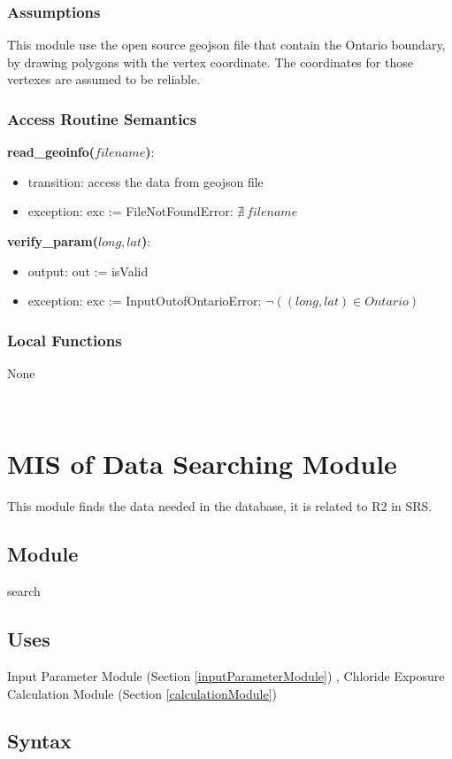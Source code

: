 \documentclass[12pt, titlepage]{article}
\begin{document}
\subsubsection{Assumptions}
This module use the open source geojson file that contain the Ontario boundary, by drawing polygons with the vertex coordinate. The coordinates for those vertexes are assumed to be reliable.

\subsubsection{Access Routine Semantics}
\noindent \textbf{read\_geoinfo($filename$)}:
\begin{itemize}
\item transition: access the data from geojson file
\item exception: exc := FileNotFoundError: $\nexists ~ filename$
\end{itemize}
\noindent \textbf{verify\_param($long, lat$)}:
\begin{itemize}
\item output: out := isValid
\item exception: exc := InputOutofOntarioError: $\lnot ((long, lat) \in Ontario)$
\end{itemize}

\subsubsection{Local Functions}
None
  
~\newpage

\section{MIS of Data Searching Module} \label{dataSearchingModule} 
This module finds the data needed in the database, it is related to R2 in SRS.
\subsection{Module}

search

\subsection{Uses}
 Input Parameter Module (Section \ref{inputParameterModule})
, Chloride Exposure Calculation Module (Section \ref{calculationModule})


\subsection{Syntax}
\end{document}

